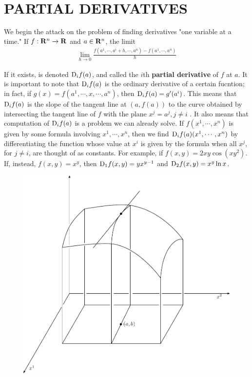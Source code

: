 \clearpage
\section{PARTIAL DERIVATIVES}
We begin the attack on the problem of finding derivatives
"one variable at a time." If $f: \mathbf{R}^n\to \mathbf{R}$ and $a\in \mathbf{R}^n$, 
the limit
\begin{align}
    \lim_{h\to 0} \frac{f(a^1, \cdots, a^i+h, \cdots, a^n) - f(a^1, \cdots, a^n)}{h}
\end{align}

If it exists, is denoted $\mathrm{D}_if(a)$, and called the $i$th \textbf{partial derivative} 
of $f$ at $a$. It is important to note that $\mathrm{D}_if(a)$ is the ordinary derivative of
a certain fucntion; in fact, if $g(x) = f(a^1, \cdots, x, \cdots, a^n)$, then $\mathrm{D}_if(a) = g'(a^i)$.
This means that $\mathrm{D}_if(a)$ is the slope of the tangent line at $(a, f(a))$ to the 
curve obtained by intersecting the tangent line of $f$ with the plane $x^j=a^j, j\neq i$ .
It also means that computation of $\mathrm{D}_if(a)$ is a problem we can already solve. If $f(x^1, \cdots, x^n)$
is given by some formula involving $x^1, \cdots, x^n$, then we find $\mathrm{D}_if(a)(x^1, \cdots, x^n)$ by differentiating 
the function whose value at $x^i$ is given by the formula when all $x^j$, for $j\neq i$, are 
thought of as constants. For example, if $f(x, y) = 2xy\cos(xy^2)$. If, instead, $f(x, y)= x^y$, then 
$\mathrm{D}_1f(x, y) = yx^{y-1}$ and $\mathrm{D}_2f(x, y) = x^y \ln x$. 

\begin{figure}[!htb]
    \centering
    \includegraphics[width=.75\linewidth]{./pics/Fig2-1.pdf}
    \caption{}
    \label{Fig 2-1}
\end{figure}

